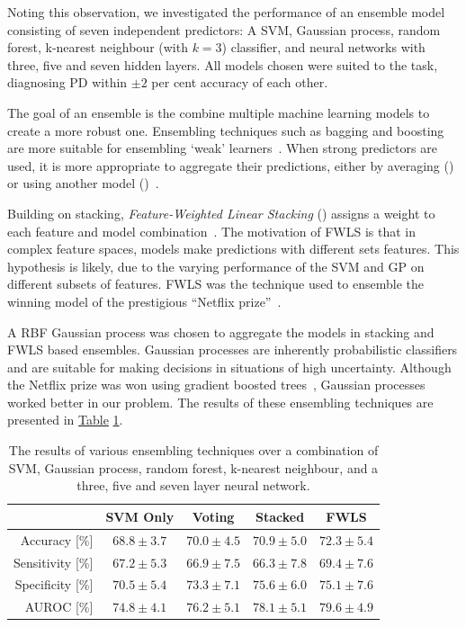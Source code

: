 \documentclass[12pt, twoside]{book}
\renewcommand\emph[1]{\textit{\color{USred}{#1}}}
\begin{document}
Noting this observation, we investigated the performance of an ensemble model consisting of seven independent predictors: A SVM, Gaussian process, random forest, k-nearest neighbour (with $k=3$) classifier, and neural networks with three, five and seven hidden layers. All models chosen were suited to the task, diagnosing PD within $\pm2$ per cent accuracy of each other.

The goal of an ensemble is the combine multiple machine learning models to create a more robust one. Ensembling techniques such as bagging and boosting~\cite{adaboost} are more suitable for ensembling `weak' learners~\cite{ensembleml}. When strong predictors are used, it is more appropriate to aggregate their predictions, either by averaging (\emph{voting}) or using another model (\emph{stacking})~\cite{stackregression}.

Building on stacking, \textit{Feature-Weighted Linear Stacking} (\emph{FWLS}) assigns a weight to each feature and model combination~\cite{fwls}. The motivation of FWLS is that in complex feature spaces, models make predictions with different sets features. This hypothesis is likely, due to the varying performance of the SVM and GP on different subsets of features. FWLS was the technique used to ensemble the winning model of the prestigious ``Netflix prize''~\cite{netflixprizebellkor}.


A RBF Gaussian process was chosen to aggregate the models in stacking and FWLS based ensembles. Gaussian processes are inherently probabilistic classifiers and are suitable for making decisions in situations of high uncertainty. Although the Netflix prize was won using gradient boosted trees~\cite{gradientboosting}, Gaussian processes worked better in our problem. The results of these ensembling techniques are presented in \hyperref[ensembles]{Table} \ref{ensembles}.


\begin{table}[!htb]
	\caption{The results of various ensembling techniques over a combination of SVM, Gaussian process, random forest, k-nearest neighbour, and a three, five and seven layer neural network.}
	\label{ensembles}
	\centering
	\begin{tabular}{@{}rcccc@{}}
		&  SVM Only & Voting & Stacked & FWLS \\ \midrule
		Accuracy [\%]    &  $68.8\pm3.7$ & $70.0\pm4.5$ &$70.9\pm5.0$&$72.3\pm5.4$\\ \midrule
		Sensitivity [\%] &  $67.2\pm5.3$ & $66.9\pm7.5$ &$66.3\pm7.8$& $69.4\pm7.6$\\ \midrule
		Specificity [\%] &  $70.5\pm5.4$ & $73.3\pm7.1$ &$75.6\pm6.0$& $75.1\pm7.6$\\ \midrule
		AUROC [\%]       &  $74.8\pm4.1$ & $76.2\pm5.1$ &$78.1\pm5.1$ & $79.6\pm4.9$ \\ \midrule
	\end{tabular}
\end{table}
\end{document}
